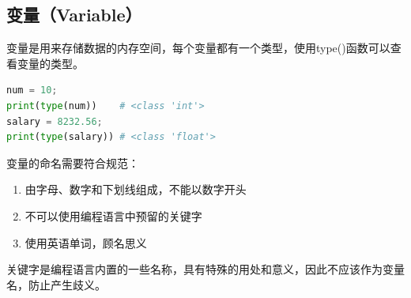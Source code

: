 \vspace{0.5cm}

\subsection{变量（Variable）}

变量是用来存储数据的内存空间，每个变量都有一个类型，使用type()函数可以查看变量的类型。

\vspace{-0.5cm}

\begin{lstlisting}[language=Python]
num = 10;
print(type(num))	# <class 'int'>
salary = 8232.56;
print(type(salary))	# <class 'float'>
\end{lstlisting}

\vspace{0.5cm}

变量的命名需要符合规范：

\begin{enumerate}
	\item 由字母、数字和下划线组成，不能以数字开头
	\item 不可以使用编程语言中预留的关键字
	\item 使用英语单词，顾名思义
\end{enumerate}

关键字是编程语言内置的一些名称，具有特殊的用处和意义，因此不应该作为变量名，防止产生歧义。\\

\begin{table}[H]
	\centering
	\caption{关键字}
\end{table}

